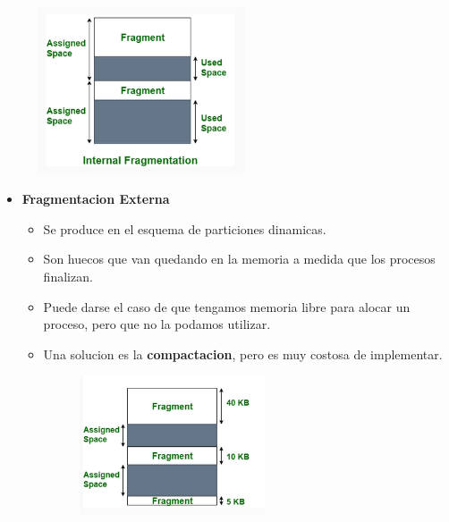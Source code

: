 \documentclass[12pt]{article}
\begin{document}
\begin{figure}[h]
    \begin{center}
        \includegraphics[width=0.55\textwidth]{assets/frag_interna.png}
    \end{center}
\end{figure}

\begin{itemize}
    \item \textbf{Fragmentacion Externa}
        \begin{itemize}
            \item Se produce en el esquema de particiones dinamicas.
            \item Son huecos que van quedando en la memoria a medida que los procesos finalizan.
            \item Puede darse el caso de que tengamos memoria libre para alocar un proceso, pero que no la podamos utilizar.

            \item Una solucion es la \textbf{compactacion}, pero es muy costosa de implementar.
    \begin{figure}
        \begin{center}
            \includegraphics[width=0.55\textwidth]{assets/frag_externa.png}
        \end{center}
    \end{figure}
\end{itemize}
\end{itemize}
\end{document}

